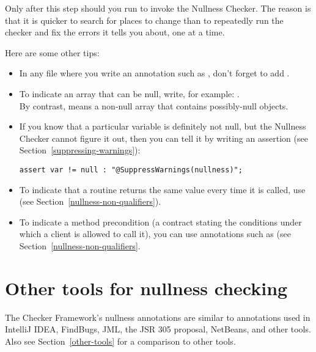 Only after this step should you run  to invoke
the Nullness Checker.  The reason is that it is quicker to search for
places to change than to repeatedly run the checker and fix the errors it
tells you about, one at a time.

Here are some other tips:
\begin{itemize}
\item
    In any file where you write an annotation such as ,
    don't forget to add .
\item
    To indicate an array that can be null, write, for example: . \\
    By contrast,  means a non-null array that
    contains possibly-null objects.
\item
    If you know that a particular variable is definitely not null, but the
    Nullness Checker cannot figure it out, then you can tell it by writing
    an assertion (see Section~\ref{suppressing-warnings}):
\begin{Verbatim}
assert var != null : "@SuppressWarnings(nullness)";
\end{Verbatim}
\item
    To indicate that a routine returns the same value every time it is
    called, use  (see Section~\ref{nullness-non-qualifiers}).
\item
    To indicate a method precondition (a contract stating the conditions
    under which a client is allowed to call it), you can use annotations
    such as  (see Section~\ref{nullness-non-qualifiers}.
\end{itemize}



\section{Other tools for nullness checking\label{nullness-related-work}}

\newcommand{\linktoNonNull}{\code{\refclass{nullness/quals}{NonNull}}}
\newcommand{\linktoNullable}{\code{\refclass{nullness/quals}{Nullable}}}

The Checker Framework's nullness annotations are similar to annotations used
in IntelliJ IDEA, FindBugs, JML, the JSR 305 proposal, NetBeans, and other tools.  Also
see Section~\ref{other-tools} for a comparison to other tools.

